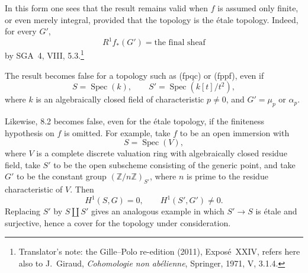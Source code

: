 In this form one sees that the result remains valid when \(f\) is
assumed only finite, or even merely integral, provided that the
topology is the étale topology. Indeed, for every \(G'\),
\[
  R^1f_*(G')=\text{the final sheaf}
\]
by SGA~4, VIII, 5.3.\footnote{Translator's note: the Gille--Polo re-edition (2011), Exposé~XXIV, refers here also to J.~Giraud,
\emph{Cohomologie non abélienne}, Springer, 1971, V, 3.1.4.}

The result becomes false for a topology such as \textup{(fpqc)} or
\textup{(fppf)}, even if
\[
  S=\operatorname{Spec}(k),
  \qquad
  S'=\operatorname{Spec}(k[t]/t^2),
\]
where \(k\) is an algebraically closed field of characteristic
\(p\neq0\), and \(G'=\mu_p\) or \(\alpha_p\).

Likewise, 8.2 becomes false, even for the étale topology, if the
finiteness hypothesis on \(f\) is omitted. For example, take \(f\)
to be an open immersion with
\[
  S=\operatorname{Spec}(V),
\]
where \(V\) is a complete discrete valuation ring with algebraically
closed residue field, take \(S'\) to be the open subscheme consisting
of the generic point, and take \(G'\) to be the constant group
\((\mathbb Z/n\mathbb Z)_{S'}\), where \(n\) is prime to the residue
characteristic of \(V\). Then
\[
  H^1(S,G)=0,
  \qquad
  H^1(S',G')\neq0.
\]
Replacing \(S'\) by \(S\amalg S'\) gives an analogous example in which
\(S'\to S\) is étale and surjective, hence a cover for the topology
under consideration.

